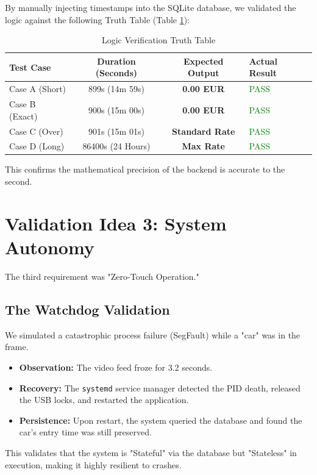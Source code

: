 By manually injecting timestamps into the SQLite database, we validated the logic against the following Truth Table (Table \ref{tab:logic_truth}):

\begin{table}[H]
	\centering
	\caption{Logic Verification Truth Table}
	\label{tab:logic_truth}
	\renewcommand{\arraystretch}{1.2}
	\begin{tabular}{|l|c|c|l|}
		\hline
		\textbf{Test Case} & \textbf{Duration (Seconds)} & \textbf{Expected Output} & \textbf{Actual Result} \\ \hline
		Case A (Short) & 899s (14m 59s) & \textbf{0.00 EUR} & \textcolor{green}{PASS} \\ \hline
		Case B (Exact) & 900s (15m 00s) & \textbf{0.00 EUR} & \textcolor{green}{PASS} \\ \hline
		Case C (Over) & 901s (15m 01s) & \textbf{Standard Rate} & \textcolor{green}{PASS} \\ \hline
		Case D (Long) & 86400s (24 Hours) & \textbf{Max Rate} & \textcolor{green}{PASS} \\ \hline
	\end{tabular}
\end{table}

This confirms the mathematical precision of the backend is accurate to the second.

\section{Validation Idea 3: System Autonomy}
The third requirement was "Zero-Touch Operation."

\subsection{The Watchdog Validation}
We simulated a catastrophic process failure (SegFault) while a "car" was in the frame.
\begin{itemize}
	\item \textbf{Observation:} The video feed froze for 3.2 seconds.
	\item \textbf{Recovery:} The \texttt{systemd} service manager detected the PID death, released the USB locks, and restarted the application.
	\item \textbf{Persistence:} Upon restart, the system queried the database and found the car's entry time was still preserved.
\end{itemize}
This validates that the system is "Stateful" via the database but "Stateless" in execution, making it highly resilient to crashes.

